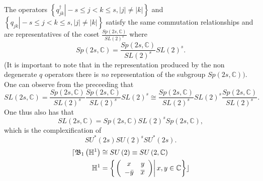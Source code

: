 \documentclass[aps,preprint]{revtex4}%
\begin{document}
The operators $\left\{  \left.  q_{jk}^{\dagger}\right\vert -s\leq j<k\leq
s,\left\vert j\right\vert \neq\left\vert k\right\vert \right\}  $ and
$\left\{  \left.  q_{jk}\right\vert -s\leq j<k\leq s,\left\vert j\right\vert
\neq\left\vert k\right\vert \right\}  $ satisfy the same commutation
relationships and are representatives of the coset $\frac{Sp\left(
2s,\mathbb{C}\right)  }{SL\left(  2\right)  ^{s}}$ where
\begin{equation}
Sp\left(  2s,\mathbb{C}\right)  =\frac{Sp\left(  2s,\mathbb{C}\right)
}{SL\left(  2\right)  ^{s}}SL\left(  2\right)  ^{s}.
\end{equation}
(It is important to note that in the representation produced by the non
degenerate $q$ operators there is \emph{no} representation of the subgroup
$Sp\left(  2s,\mathbb{C}\right)  ).$ One can observe from the preceeding that
\begin{equation}
SL\left(  2s,\mathbb{C}\right)  =\frac{Sp\left(  2s,\mathbb{C}\right)
}{SL\left(  2\right)  ^{s}}\frac{Sp\left(  2s,\mathbb{C}\right)  }{SL\left(
2\right)  ^{s}}SL\left(  2\right)  ^{s}\cong\frac{Sp\left(  2s,\mathbb{C}%
\right)  }{SL\left(  2\right)  ^{s}}SL\left(  2\right)  ^{s}\frac{Sp\left(
2s,\mathbb{C}\right)  }{SL\left(  2\right)  ^{s}}.
\end{equation}
One thus also has that
\begin{equation}
SL\left(  2s,\mathbb{C}\right)  =Sp\left(  2s,\mathbb{C}\right)  SL\left(
2\right)  ^{s}Sp\left(  2s,\mathbb{C}\right)  ,
\end{equation}
which is the complexification of
\begin{equation}
SU^{\ast}\left(  2s\right)  SU\left(  2\right)  ^{s}SU^{\ast}\left(
2s\right)  .
\end{equation}%
\begin{align}
\lceil\mathfrak{B}_{1}\left(  \mathbb{H}^{1}\right)   &  \cong SU\left(
2\right)  \equiv SU\left(  2,\mathbb{C}\right)  \\
\mathbb{H}^{1} &  =\left\{  \left.  \left(
\begin{array}
[c]{cc}%
x & y\\
-\bar{y} & \overline{x}%
\end{array}
\right)  \right\vert x,y\in\mathbb{C}\right\}  \rfloor
\end{align}
\end{document}
